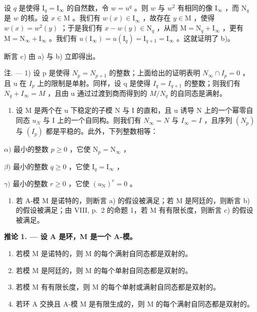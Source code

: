设 \(q\) 是使得 \(\mathrm{I}_q = \mathrm{I}_{\infty}\) 的自然数，令 \(w = u^q\) 。则 \(w\) 与 \(w^2\) 有相同的像 \(\mathrm{I}_{\infty}\) ，而 \(\mathrm{N}_q\) 是 \(w\) 的核。设 \(x \in \mathrm{M}\) 。我们有 \(w(x) \in \mathrm{I}_{\infty}\) ，故存在 \(y \in \mathrm{M}\) ，使得 \(w(x) = w^2(y)\) ；于是我们有 \(x - w(y) \in \mathrm{N}_q\) ，从而 \(\mathrm{M} = \mathrm{N}_q + \mathrm{I}_{\infty}\) ，更有 \(\mathrm{M} = \mathrm{N}_{\infty} + \mathrm{I}_{\infty}\) 。我们有 \(u(\mathrm{I}_{\infty}) = u(\mathrm{I}_q) = \mathrm{I}_{q+1} = \mathrm{I}_{\infty}\) 。这就证明了 b)。

断言 c) 由 a) 与 b) 立即得出。

注. --- 1) 设 p 是使得 \(N_{p} = N_{p+1}\) 的整数；上面给出的证明表明 \(N_{\infty} \cap I_{p} = 0\) ，且 u 在 \(I_{p}\) 上的限制是单射。同样，设 q 是使得 \(I_{q} = I_{q+1}\) 的整数；则我们有 \(N_{q} + I_{\infty} = M\) ，且由 u 通过过渡到商而得到的 \(M/N_{q}\) 的自同态是满射。

\begin{enumerate}
\def\labelenumi{\arabic{enumi})}
\setcounter{enumi}{1}
\tightlist
\item
  设 M 是两个在 u 下稳定的子模 N 与 I 的直和，且 u 诱导 N 上的一个幂零自同态 \(u_{N}\) 与 I 上的一个自同构。则我们有 \(N_{\infty} = N\) 与 \(I_{\infty} = I\) ，且序列 \((N_{p})\) 与 \((I_{p})\) 都是平稳的。此外，下列整数相等：
\end{enumerate}

\(\alpha)\) 最小的整数 \(p \geqslant 0\) ，它使 \(\mathrm{N}_p = \mathrm{N}_{\infty}\) ，

\(\beta)\) 最小的整数 \(q \geqslant 0\) ，它使 \(\mathrm{I}_q = \mathrm{I}_{\infty}\) ，

\(\gamma)\) 最小的整数 \(r \geqslant 0\) ，它使 \((u_{\mathrm{N}})^{r} = 0\) 。

\begin{enumerate}
\def\labelenumi{\arabic{enumi})}
\setcounter{enumi}{2}
\tightlist
\item
  若 A-模 M 是诺特的，则断言 a) 的假设被满足；若 M 是阿廷的，则断言 b) 的假设被满足；由 VIII, p.~2 的命题 1，若 M 有有限长度，则断言 c) 的假设被满足。
\end{enumerate}

\textbf{推论 1. --- 设 A 是环，M 是一个 A-模。}

\begin{enumerate}
\def\labelenumi{\alph{enumi})}
\item
  若模 M 是诺特的，则 M 的每个满射自同态都是双射的。
\item
  若模 M 是阿廷的，则 M 的每个单射自同态都是双射的。
\item
  若模 M 有有限长度，则 M 的每个单射或满射自同态都是双射的。
\item
  若环 A 交换且 A-模 M 是有限生成的，则 M 的每个满射自同态都是双射的。
\end{enumerate}

